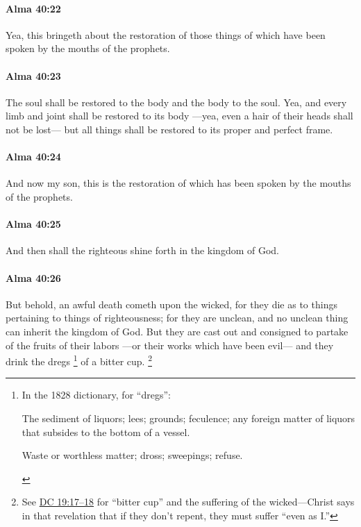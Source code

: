 		\paragraph{Alma 40:22} %
			\label{ALMA-40-22}

			Yea, this bringeth about the restoration of those things
			of which have been spoken by the mouths of the prophets.

		\paragraph{Alma 40:23} %
			\label{ALMA-40-23}

			The soul shall be restored to the body and the body to the soul.
			Yea, and every limb and joint shall be restored to its body
			---yea, even a hair of their heads shall not be lost---
			but all things shall be restored to its proper and perfect frame.

		\paragraph{Alma 40:24} %
			\label{ALMA-40-24}

			And now my son, this is the restoration
			of which has been spoken by the mouths of the prophets.

		\paragraph{Alma 40:25} %
			\label{ALMA-40-25}

			And then shall the righteous shine forth in the kingdom of God.

		\paragraph{Alma 40:26} %
			\label{ALMA-40-26}

			But behold, an awful death cometh upon the wicked,
			for they die as to things pertaining to things of righteousness;
			for they are unclean,
			and no unclean thing can inherit the kingdom of God.
			But they are cast out and consigned to partake of the fruits of their labors
			---or their works which have been evil---
			and they drink the dregs%
				\footnote{%
					In the 1828 dictionary, for ``dregs'':
						\begin{compactitem}
							\item[1] The sediment of liquors; lees; grounds; feculence; any foreign matter of liquors that subsides to the bottom of a vessel.
							\item[2] Waste or worthless matter; dross; sweepings; refuse.
						\end{compactitem}
					}
			of a bitter cup.%
				\footnote{%
					See \hyperref[DC19-17]{DC 19:17--18} for ``bitter cup'' and the suffering of the wicked---Christ says in that revelation that if they don't repent, they must suffer ``even as I.''
					}

